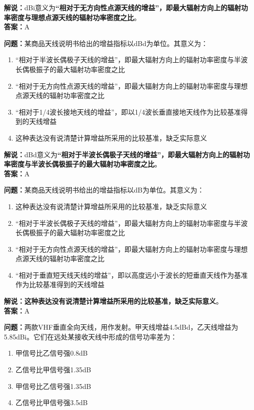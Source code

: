 \textbf{解说：}dBi意义为\textbf{“相对于无方向性点源天线的增益”，即最大辐射方向上的辐射功率密度与理想点源天线的辐射功率密度之比}。\\\textbf{答案：}A



\textbf{问题：}某商品天线说明书给出的增益指标以dBd为单位。其意义为：

\begin{enumerate}[label=\Alph*), leftmargin=1cm]
	\item “相对于半波长偶极子天线的增益”，即最大辐射方向上的辐射功率密度与半波长偶极振子的最大辐射功率密度之比
	\item “相对于无方向性点源天线的增益”，即最大辐射方向上的辐射功率密度与理想点源天线的辐射功率密度之比
	\item “相对于1/4波长接地天线的增益”，即以1/4波长垂直接地天线作为比较基准得到的天线增益
	\item 这种表达没有说清楚计算增益所采用的比较基准，缺乏实际意义
\end{enumerate}

\textbf{解说：}dBd意义为\textbf{“相对于半波长偶极子天线的增益”，即最大辐射方向上的辐射功率密度与半波长偶极振子的最大辐射功率密度之比}。\\\textbf{答案：}A



\textbf{问题：}某商品天线说明书给出的增益指标以dB为单位。其意义为：

\begin{enumerate}[label=\Alph*), leftmargin=1cm]
	\item 这种表达没有说清楚计算增益所采用的比较基准，缺乏实际意义
	\item “相对于半波长偶极子天线的增益”，即最大辐射方向上的辐射功率密度与半波长偶极振子的最大辐射功率密度之比
	\item “相对于无方向性点源天线的增益”，即最大辐射方向上的辐射功率密度与理想点源天线的辐射功率密度之比
	\item “相对于垂直短天线天线的增益”，即以高度远小于波长的短垂直天线作为基准作为比较基准得到的天线增益
\end{enumerate}

\textbf{解说：这种表达没有说清楚计算增益所采用的比较基准，缺乏实际意义}。\\\textbf{答案：}A



\textbf{问题：}两款VHF垂直全向天线，用作发射。甲天线增益4.5dBd，乙天线增益为5.85dBi。它们在远处某接收天线中形成的信号功率差为：

\begin{enumerate}[label=\Alph*), leftmargin=1cm]
	\item 甲信号比乙信号强0.8dB
	\item 乙信号比甲信号强1.35dB
	\item 甲信号比乙信号强1.35dB
	\item 乙信号比甲信号强3.5dB
\end{enumerate}

